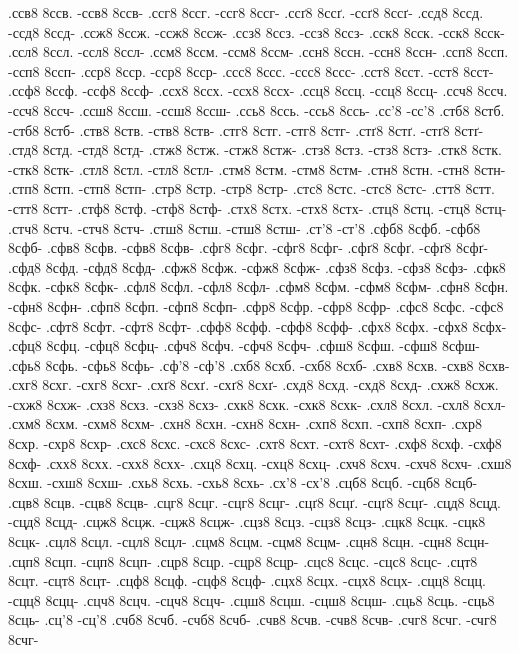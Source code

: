 {.ссв8 8ссв. -ссв8 8ссв-
.ссг8 8ссг. -ссг8 8ссг-
.ссґ8 8ссґ. -ссґ8 8ссґ-
.ссд8 8ссд. -ссд8 8ссд-
.ссж8 8ссж. -ссж8 8ссж-
.ссз8 8ссз. -ссз8 8ссз-
.сск8 8сск. -сск8 8сск-
.ссл8 8ссл. -ссл8 8ссл-
.ссм8 8ссм. -ссм8 8ссм-
.ссн8 8ссн. -ссн8 8ссн-
.ссп8 8ссп. -ссп8 8ссп-
.сср8 8сср. -сср8 8сср-
.ссс8 8ссс. -ссс8 8ссс-
.сст8 8сст. -сст8 8сст-
.ссф8 8ссф. -ссф8 8ссф-
.ссх8 8ссх. -ссх8 8ссх-
.ссц8 8ссц. -ссц8 8ссц-
.ссч8 8ссч. -ссч8 8ссч-
.ссш8 8ссш. -ссш8 8ссш-
.ссь8 8ссь. -ссь8 8ссь-
.сс'8 -сс'8
.стб8 8стб. -стб8 8стб-
.ств8 8ств. -ств8 8ств-
.стг8 8стг. -стг8 8стг-
.стґ8 8стґ. -стґ8 8стґ-
.стд8 8стд. -стд8 8стд-
.стж8 8стж. -стж8 8стж-
.стз8 8стз. -стз8 8стз-
.стк8 8стк. -стк8 8стк-
.стл8 8стл. -стл8 8стл-
.стм8 8стм. -стм8 8стм-
.стн8 8стн. -стн8 8стн-
.стп8 8стп. -стп8 8стп-
.стр8 8стр. -стр8 8стр-
.стс8 8стс. -стс8 8стс-
.стт8 8стт. -стт8 8стт-
.стф8 8стф. -стф8 8стф-
.стх8 8стх. -стх8 8стх-
.стц8 8стц. -стц8 8стц-
.стч8 8стч. -стч8 8стч-
.стш8 8стш. -стш8 8стш-
.ст'8 -ст'8
.сфб8 8сфб. -сфб8 8сфб-
.сфв8 8сфв. -сфв8 8сфв-
.сфг8 8сфг. -сфг8 8сфг-
.сфґ8 8сфґ. -сфґ8 8сфґ-
.сфд8 8сфд. -сфд8 8сфд-
.сфж8 8сфж. -сфж8 8сфж-
.сфз8 8сфз. -сфз8 8сфз-
.сфк8 8сфк. -сфк8 8сфк-
.сфл8 8сфл. -сфл8 8сфл-
.сфм8 8сфм. -сфм8 8сфм-
.сфн8 8сфн. -сфн8 8сфн-
.сфп8 8сфп. -сфп8 8сфп-
.сфр8 8сфр. -сфр8 8сфр-
.сфс8 8сфс. -сфс8 8сфс-
.сфт8 8сфт. -сфт8 8сфт-
.сфф8 8сфф. -сфф8 8сфф-
.сфх8 8сфх. -сфх8 8сфх-
.сфц8 8сфц. -сфц8 8сфц-
.сфч8 8сфч. -сфч8 8сфч-
.сфш8 8сфш. -сфш8 8сфш-
.сфь8 8сфь. -сфь8 8сфь-
.сф'8 -сф'8
.схб8 8схб. -схб8 8схб-
.схв8 8схв. -схв8 8схв-
.схг8 8схг. -схг8 8схг-
.схґ8 8схґ. -схґ8 8схґ-
.схд8 8схд. -схд8 8схд-
.схж8 8схж. -схж8 8схж-
.схз8 8схз. -схз8 8схз-
.схк8 8схк. -схк8 8схк-
.схл8 8схл. -схл8 8схл-
.схм8 8схм. -схм8 8схм-
.схн8 8схн. -схн8 8схн-
.схп8 8схп. -схп8 8схп-
.схр8 8схр. -схр8 8схр-
.схс8 8схс. -схс8 8схс-
.схт8 8схт. -схт8 8схт-
.схф8 8схф. -схф8 8схф-
.схх8 8схх. -схх8 8схх-
.схц8 8схц. -схц8 8схц-
.схч8 8схч. -схч8 8схч-
.схш8 8схш. -схш8 8схш-
.схь8 8схь. -схь8 8схь-
.сх'8 -сх'8
.сцб8 8сцб. -сцб8 8сцб-
.сцв8 8сцв. -сцв8 8сцв-
.сцг8 8сцг. -сцг8 8сцг-
.сцґ8 8сцґ. -сцґ8 8сцґ-
.сцд8 8сцд. -сцд8 8сцд-
.сцж8 8сцж. -сцж8 8сцж-
.сцз8 8сцз. -сцз8 8сцз-
.сцк8 8сцк. -сцк8 8сцк-
.сцл8 8сцл. -сцл8 8сцл-
.сцм8 8сцм. -сцм8 8сцм-
.сцн8 8сцн. -сцн8 8сцн-
.сцп8 8сцп. -сцп8 8сцп-
.сцр8 8сцр. -сцр8 8сцр-
.сцс8 8сцс. -сцс8 8сцс-
.сцт8 8сцт. -сцт8 8сцт-
.сцф8 8сцф. -сцф8 8сцф-
.сцх8 8сцх. -сцх8 8сцх-
.сцц8 8сцц. -сцц8 8сцц-
.сцч8 8сцч. -сцч8 8сцч-
.сцш8 8сцш. -сцш8 8сцш-
.сць8 8сць. -сць8 8сць-
.сц'8 -сц'8
.счб8 8счб. -счб8 8счб-
.счв8 8счв. -счв8 8счв-
.счг8 8счг. -счг8 8счг-
}

